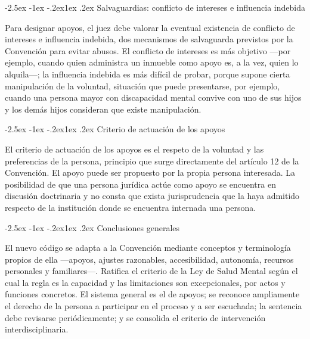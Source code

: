 \documentclass[12pt,oneside]{book}
\makeatletter
\renewcommand\subsection{\@startsection{subsection}{2}{\z@}%
  {-2.5ex \@plus -1ex \@minus -.2ex}{1ex \@plus .2ex}%
  {\normalfont\normalsize\bfseries}}
\makeatother
\begin{document}
\subsection{Salvaguardias: conflicto de intereses e influencia indebida}

Para designar apoyos, el juez debe valorar la eventual existencia de conflicto de intereses e influencia indebida, dos mecanismos de salvaguarda previstos por la Convención para evitar abusos. El conflicto de intereses es más objetivo ---por ejemplo, cuando quien administra un inmueble como apoyo es, a la vez, quien lo alquila---; la influencia indebida es más difícil de probar, porque supone cierta manipulación de la voluntad, situación que puede presentarse, por ejemplo, cuando una persona mayor con discapacidad mental convive con uno de sus hijos y los demás hijos consideran que existe manipulación.

\subsection{Criterio de actuación de los apoyos}

El criterio de actuación de los apoyos es el respeto de la voluntad y las preferencias de la persona, principio que surge directamente del artículo 12 de la Convención. El apoyo puede ser propuesto por la propia persona interesada. La posibilidad de que una persona jurídica actúe como apoyo se encuentra en discusión doctrinaria y no consta que exista jurisprudencia que la haya admitido respecto de la institución donde se encuentra internada una persona.


\subsection{Conclusiones generales}

El nuevo código se adapta a la Convención mediante conceptos y terminología propios de ella ---apoyos, ajustes razonables, accesibilidad, autonomía, recursos personales y familiares---. Ratifica el criterio de la Ley de Salud Mental según el cual la regla es la capacidad y las limitaciones son excepcionales, por actos y funciones concretos. El sistema general es el de apoyos; se reconoce ampliamente el derecho de la persona a participar en el proceso y a ser escuchada; la sentencia debe revisarse periódicamente; y se consolida el criterio de intervención interdisciplinaria.
\end{document}
